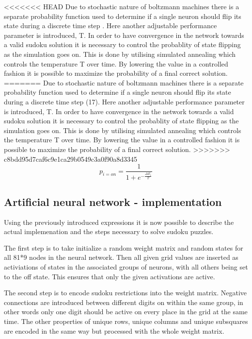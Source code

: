 \documentclass[a4paper,11pt]{kth-mag}
\begin{document}
<<<<<<< HEAD
Due to stochastic nature of boltzmann machines there is a separate probability function used to determine if a single neuron should flip its state during a discrete time step \cite{boltzmann2}. Here another adjustable performance parameter is introduced, T. In order to have convergence in the network towards a valid sudoku solution it is necessary to control the probablity of state flipping as the simulation goes on. This is done by utilising simulated annealing which controls the temperature T over time. By lowering the value in a controlled fashion it is possible to maximize the probability of a final correct solution.
=======
Due to stochastic nature of boltzmann machines there is a separate probability function used to determine if a single neuron should flip its state during a discrete time step (17).
Here another adjustable performance parameter is introduced, T.
In order to have convergence in the network towards a valid sudoku solution it is necessary to control the probablity of state flipping as the simulation goes on.
This is done by utilising simulated annealing which controls the temperature T over time.
By lowering the value in a controlled fashion it is possible to maximize the probability of a final correct solution.
>>>>>>> c8bdd95d7caf6c9e1ca29b0549c3a0f90a8d3345
\[
p_{i=on} = \frac{1}{1+e^{-\frac{\Delta E_{i}}{T}}}
\]

\subsection{Artificial neural network - implementation}

Using the previously introduced expressions it is now possible to describe the actual implemenation and the steps necessary to solve sudoku puzzles.
\newline

The first step is to take initialize a random weight matrix and random states for all 81*9 nodes in the neural network.
Then all given grid values are inserted as activiations of states in the associated groups of neurons, with all others being set to the off state.
This ensures that only the given activations are active.
\newline

The second step is to encode sudoku restrictions into the weight matrix.
Negative connections are introduced between different digits on within the same group, in other words only one digit should be active on every place in the grid at the same time.
The other properties of unique rows, unique columns and unique subsquares are encoded in the same way but processed with the whole weight matrix.
\newline
\end{document}
